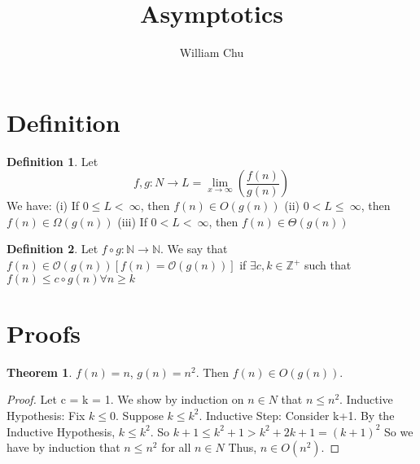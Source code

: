 \documentclass{article}
\theoremstyle{definition}
\newtheorem{definition}{Definition}[section]
\newtheorem{theorem}{Theorem}[section]
\begin{document}
 
\title{Asymptotics} 
\author{William Chu} 
\maketitle 

\section{Definition}
\begin{definition}
Let $$f,g: N \rightarrow L=\lim _{x\to \infty }\left(\frac{f\left(n\right)}{g\left(n\right)}\right)$$
We have: (i) If $0 \leq L< \:\infty$, then $f(n)\in O(g(n))$ (ii) $0 < L \leq \:\infty$, then $f(n)\in\Omega(g(n))$ (iii) If $0<L< \:\infty$, then $f(n)\in\Theta(g(n))$
\end{definition}

\begin{definition}
Let $f \circ g: \mathbb{N} \rightarrow \mathbb{N}$. We say that $ f(n) \in \mathcal{O}(g(n)) [f(n) = \mathcal{O}(g(n))]$ if $\exists c,k\in \mathbb{Z}^{+}$ such that $f(n) \leq c\circ g(n) \forall n \geq k$
\end{definition}


\section{Proofs}

\begin{theorem}
$f(n)=n$, $g(n) =n^2$. Then $f(n)\in O(g(n))$.
\end{theorem}
\begin{proof}
Let c = k = 1. We show by induction on $n \in N$ that $n \leq n^2$. Inductive Hypothesis: Fix $k \leq 0$. Suppose $k \leq k^2$.
Inductive Step: Consider k+1. By the Inductive Hypothesis, $k \leq k^2$. So $k+1 \leq k^2+1 > k^2 +2k+1 = (k+1)^2$ So we have by induction that $n \leq n^2$ for all $n \in N$ Thus, $n \in O(n^2)$.
\end{proof}
\end{document}
